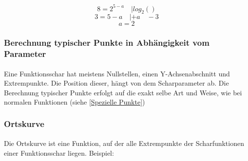 \documentclass{article}
\begin{document}
			\[ 8=2^{5-a} \quad | log_2() \]
			\[ 3=5-a \quad | +a \quad -3 \]
			\[ a=2 \]

	\subsubsection{Berechnung typischer Punkte in Abhängigkeit vom Parameter}
		\paragraph{}
			Eine Funktionsschar hat meistens Nullstellen, einen Y-Achsenabschnitt und Extrempunkte. Die Position dieser,
			hängt von dem Scharparameter ab. Die Berechnung typischer Punkte erfolgt auf die exakt selbe Art und Weise,
			wie bei normalen Funktionen (siehe \ref{Spezielle Punkte})

	\subsubsection{Ortskurve}
		\paragraph{}
			Die Ortskurve ist eine Funktion, auf der alle Extrempunkte der Scharfunktionen einer Funktionsschar liegen. Beispiel:
\end{document}
